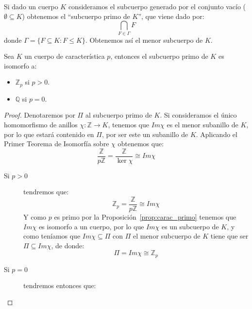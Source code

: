 \begin{definicion}
    Si dado un cuerpo $K$ consideramos el subcuerpo generado por el conjunto vacío ($\emptyset \subseteq K$) obtenemos el ``subcuerpo primo de $K$'', que viene dado por:
    \begin{equation*}
        \bigcap_{F\in \Gamma} F
    \end{equation*}
    donde $\Gamma = \{F\subseteq K : F\leq K\}$. Obtenemos así el menor subcuerpo de $K$.
\end{definicion}

\begin{prop}
    Sea $K$ un cuerpo de característica $p$, entonces el subcuerpo primo de $K$ es isomorfo a:
    \begin{itemize}
        \item $\mathbb{Z}_p$ si $p>0$.
        \item $\mathbb{Q}$ si $p = 0$.
    \end{itemize}
    \begin{proof}
        Denotaremos por $\Pi$ al subcuerpo primo de $K$.
        Si consideramos el único homomorfismo de anillos $\chi:\mathbb{Z}\to K$, tenemos que $Im\chi$ es el menor subanillo de $K$, por lo que estará contenido en $\Pi$, por ser este un subanillo de $K$. Aplicando el Primer Teorema de Isomorfía sobre $\chi$ obtenemos que:
        \begin{equation*}
            \dfrac{\mathbb{Z}}{p\mathbb{Z}} = \dfrac{\mathbb{Z}}{\ker\chi} \cong Im\chi 
        \end{equation*}
        \begin{description}
            \item [Si $p>0$] tendremos que:
                \begin{equation*}
                    \mathbb{Z}_p = \dfrac{\mathbb{Z}}{p\mathbb{Z}} \cong Im\chi
                \end{equation*}
                Y como $p$ es primo por la Proposición~\ref{prop:carac_primo} tenemos que $Im\chi$ es isomorfo a un cuerpo, por lo que $Im\chi $ es un subcuerpo de $K$, y como teníamos que $Im\chi\subseteq \Pi$ con $\Pi$ el menor subcuerpo de $K$ tiene que ser $\Pi\subseteq Im\chi$, de donde:
                \begin{equation*}
                    \Pi = Im\chi \cong \mathbb{Z}_p
                \end{equation*}
            \item [Si $p=0$] tendremos entonces que:
                \begin{equation*}

\end{equation*}
\end{description}
\end{proof}
\end{prop}

